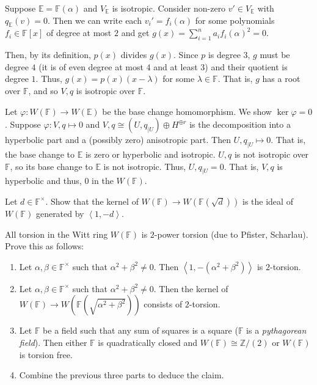 \documentclass[12 pt, letterpaper]{hmcpset}
\begin{document}
\begin{solution}
	Suppose $\mathbb{E} = \mathbb{F}(\alpha)$ and $V_{\mathbb{E}}$ is isotropic. Consider non-zero $v' \in V_{\mathbb{E}}$ with $q_{\mathbb{E}}(v) = 0$. Then we can write each $v_{i}' = f_{i}(\alpha)$ for some polynomials $f_{i} \in \mathbb{F}[x]$ of degree at most $2$ and get $g(x) = \sum_{i = 1}^{n} a_{i} f_{i}(\alpha)^{2} = 0$.

	Then, by its definition, $p(x)$ divides $g(x)$. Since $p$ is degree $3$, $g$ must be degree $4$ (it is of even degree at most $4$ and at least $3$) and their quotient is degree $1$. Thus,  $g(x) = p(x)(x - \lambda)$ for some $\lambda \in \mathbb{F}$. That is, $g$ has a root over $\mathbb{F}$, and so $V, q$ is isotropic over $\mathbb{F}$.

	Let $\varphi : W(\mathbb{F}) \to W(\mathbb{E})$ be the base change homomorphism. We show $\ker \varphi = 0$. Suppose $\varphi : V, q \mapsto 0$ and $V, q \cong (U, q_{\mid U}) \oplus H^{\oplus r}$ is the decomposition into a hyperbolic part and a (possibly zero) anisotropic part. Then $U, q_{\mid U} \mapsto 0$. That is, the base change to $\mathbb{E}$ is zero or hyperbolic and isotropic. $U, q$ is not isotropic over $\mathbb{F}$, so its base change to $\mathbb{E}$ is not isotropic. Thus, $U, q_{\mid U} = 0$. That is, $V, q$ is hyperbolic and thus, $0$ in the $W(\mathbb{F})$.
\end{solution}

\pagebreak


\begin{problem}[(1)]
	Let $d \in \mathbb{F}^{\times}$. Show that the kernel of $W(\mathbb{F}) \to W(\mathbb{F}(\sqrt{d}))$ is the ideal of $W(\mathbb{F})$ generated by $\left < 1, -d \right >$.
\end{problem}

\pagebreak

\begin{problem}[(2)]
	All torsion in the Witt ring $W(\mathbb{F})$ is $2$-power torsion (due to Pfister, Scharlau). Prove this as follows:
	\begin{enumerate}
		\item Let $\alpha, \beta \in \mathbb{F}^{\times}$ such that $\alpha^{2} + \beta^{2} \neq 0$. Then $\left < 1, -(\alpha^{2} + \beta^{2}) \right >$ is $2$-torsion.

		\item Let $\alpha, \beta \in \mathbb{F}^{\times}$ such that $\alpha^{2} + \beta^{2} \neq 0$. Then the kernel of $W(\mathbb{F}) \to W(\mathbb{F}(\sqrt{\alpha^{2} + \beta^{2}}))$ consists of $2$-torsion.

		\item Let $\mathbb{F}$ be a field such that any sum of squares is a square ($\mathbb{F}$ is a \emph{pythagorean field}). Then either $\mathbb{F}$ is quadratically closed and $W(\mathbb{F}) \cong \mathbb{Z} / (2)$ or $W(\mathbb{F})$ is torsion free.

		\item Combine the previous three parts to deduce the claim.
	\end{enumerate}
\end{problem}
\end{document}

